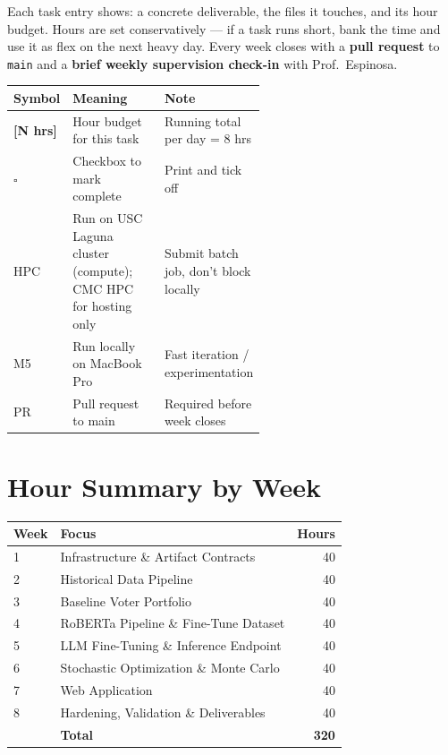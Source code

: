 \documentclass[11pt]{article}
\newcommand{\hrs}[1]{\textbf{[#1 hrs]}}
\newcommand{\done}{\textcolor{sectionblue}{$\square$}\ }
\begin{document}
Each task entry shows: a concrete deliverable, the files it touches, and its hour
budget. Hours are set conservatively --- if a task runs short, bank the time and
use it as flex on the next heavy day. Every week closes with a \textbf{pull request}
to \texttt{main} and a \textbf{brief weekly supervision check-in} with Prof.\ Espinosa.

\begin{center}
\begin{tabularx}{\linewidth}{p{0.16\linewidth}p{0.40\linewidth}X}
\toprule
\textbf{Symbol} & \textbf{Meaning} & \textbf{Note} \\
\midrule
\hrs{N}   & Hour budget for this task  & Running total per day = 8 hrs \\
\done     & Checkbox to mark complete  & Print and tick off \\
HPC       & Run on USC Laguna cluster (compute); CMC HPC for hosting only & Submit batch job, don't block locally \\
M5        & Run locally on MacBook Pro & Fast iteration / experimentation \\
PR        & Pull request to main       & Required before week closes \\
\bottomrule
\end{tabularx}
\end{center}

\section*{Hour Summary by Week}

\begin{center}
\begin{tabular}{llr}
\toprule
\textbf{Week} & \textbf{Focus} & \textbf{Hours} \\
\midrule
1 & Infrastructure \& Artifact Contracts   & 40 \\
2 & Historical Data Pipeline               & 40 \\
3 & Baseline Voter Portfolio               & 40 \\
4 & RoBERTa Pipeline \& Fine-Tune Dataset  & 40 \\
5 & LLM Fine-Tuning \& Inference Endpoint  & 40 \\
6 & Stochastic Optimization \& Monte Carlo & 40 \\
7 & Web Application                        & 40 \\
8 & Hardening, Validation \& Deliverables  & 40 \\
\midrule
  & \textbf{Total}                         & \textbf{320} \\
\bottomrule
\end{tabular}
\end{center}
\end{document}
